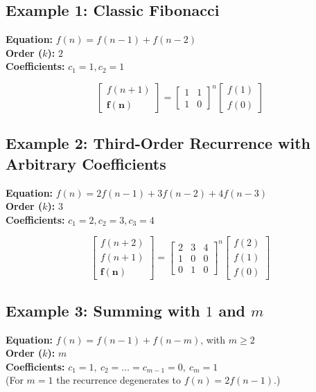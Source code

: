\documentclass[11pt]{article}
\begin{document}
\newpage

\subsection{Example 1: Classic Fibonacci}
\textbf{Equation:} $f(n) = f(n-1) + f(n-2)$ \\
\textbf{Order ($k$):} $2$ \\
\textbf{Coefficients:} $c_1 = 1, c_2 = 1$

\[
\begin{bmatrix} f(n+1) \\ \mathbf{f(n)} \end{bmatrix} = 
\begin{bmatrix} 1 & 1 \\ 1 & 0 \end{bmatrix}^n 
\begin{bmatrix} f(1) \\ f(0) \end{bmatrix}
\]

\subsection{Example 2: Third-Order Recurrence with Arbitrary Coefficients}
\textbf{Equation:} $f(n) = 2f(n-1) + 3f(n-2) + 4f(n-3)$ \\
\textbf{Order ($k$):} $3$ \\
\textbf{Coefficients:} $c_1 = 2, c_2 = 3, c_3 = 4$

\[
\begin{bmatrix} f(n+2) \\ f(n+1) \\ \mathbf{f(n)} \end{bmatrix} = 
\begin{bmatrix} 2 & 3 & 4 \\ 1 & 0 & 0 \\ 0 & 1 & 0 \end{bmatrix}^n 
\begin{bmatrix} f(2) \\ f(1) \\ f(0) \end{bmatrix}
\]

\subsection{Example 3: Summing with $1$ and $m$}
\textbf{Equation:} $f(n) = f(n-1) + f(n-m)$, with $m \ge 2$ \\
\textbf{Order ($k$):} $m$ \\
\textbf{Coefficients:} $c_1 = 1,\ c_2 = \dots = c_{m-1} = 0,\ c_m = 1$ \\
(For $m = 1$ the recurrence degenerates to $f(n) = 2f(n-1)$.)
\end{document}
